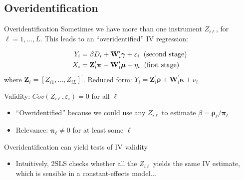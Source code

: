 \documentclass{beamer}
\begin{document}
\subsection{Overidentification}
\begin{frame}{Overidentification}
Sometimes we have more than one instrument $Z_{i\ell}$, for $\ell=1,\dots,L$. This leads to an ``overidentified'' IV regression:

\vspace{-1cm}
\begin{align*}
Y_i &=  \beta D_i +\mathbf{W}_i^\prime\boldsymbol{\gamma} +  \varepsilon_i\hspace{0.2cm}\text{(second stage)}\\
X_i &= \mathbf{Z}_i^\prime\boldsymbol{\pi} + \mathbf{W}_i^\prime\boldsymbol{\mu} + \eta_i\hspace{0.2cm}\text{(first stage)}
\end{align*}
where $\mathbf{Z}_i=[Z_{i1},\dots,Z_{iL}]^\prime$. Reduced form: $Y_i= \mathbf{Z}_i^\prime\boldsymbol{\rho} + \mathbf{W}_i^\prime\boldsymbol{\kappa}+\nu_i $\pause

Validity: $Cov(Z_{i\ell},\varepsilon_i)=0$ for all $\ell$
\begin{itemize}
  \item ``Overidentified'' because we could use any $Z_{i\ell}$ to estimate $\beta=\boldsymbol{\rho}_\ell/\boldsymbol{\pi}_\ell$\pause
  \item Relevance: $\boldsymbol{\pi}_\ell\neq 0$ for at least some $\ell$
\end{itemize}\pause\medskip

Overidentification can yield tests of IV validity
\begin{itemize}
  \item Intuitively, 2SLS checks whether all the $Z_{i\ell}$ yields the same IV estimate, which is sensible in a constant-effects model...
\end{itemize}
\end{frame}
\end{document}
